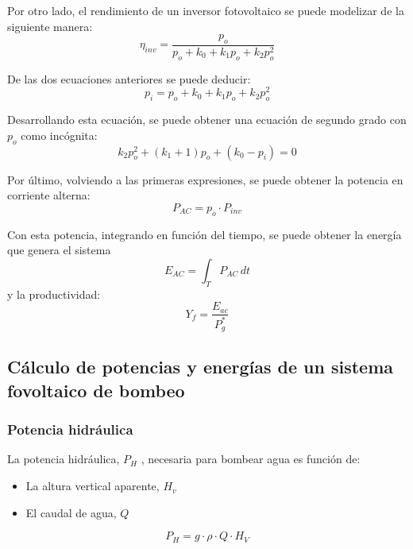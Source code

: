 Por otro lado, el rendimiento de un inversor fotovoltaico se puede modelizar de la siguiente manera:
\begin{equation}
\eta_{inv}=\frac{p_o}{p_o+k_0+k_1p_o+k_2p_o^2}
\end{equation}

De las dos ecuaciones anteriores se puede deducir:
\begin{equation}
p_i=p_o+k_0+k_1p_o+k_2p_o^2
\end{equation}

Desarrollando esta ecuación, se puede obtener una ecuación de segundo grado con \(p_o\) como incógnita:
\begin{equation}
k_2p_o^2+(k_1+1)p_o+(k_0-p_i)=0
\end{equation}

Por último, volviendo a las primeras expresiones, se puede obtener la potencia en corriente alterna:
\begin{equation}
P_{AC}=p_o\cdot P_{inv}
\end{equation}

Con esta potencia, integrando en función del tiempo, se puede obtener la energía que genera el sistema
\begin{equation}
E_{AC}=\int_{T} P_{AC} \,dt
\end{equation}
y la productividad:
\begin{equation}
Y_f=\frac{E_{ac}}{P_g^*}
\end{equation}

\subsection{Cálculo de potencias y energías de un sistema fovoltaico de bombeo}
\label{sec:orgeac037c}
\subsubsection{Potencia hidráulica}
\label{sec:orgbed975d}
La potencia hidráulica, \(P_H\) , necesaria para bombear agua es función de:
\begin{itemize}
\item La altura vertical aparente, \(H_v\) 
\item El caudal de agua, \(Q\)   
\end{itemize}
\begin{equation}
P_H=g\cdot \rho \cdot Q \cdot H_V
\end{equation}

